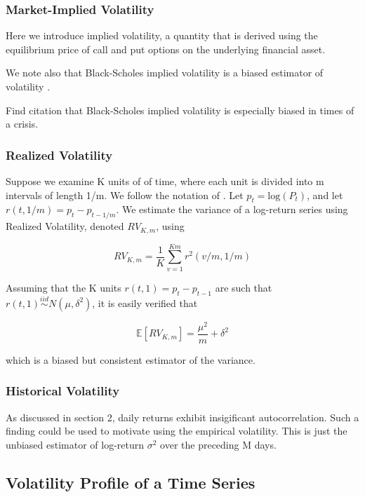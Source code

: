 \documentclass[11pt]{article}
\newcommand{\simiid}{\stackrel{iid}{\sim}} %
\def\E{\mathbb{E}} %
\theoremstyle{definition}
\begin{document}
\subsubsection{Market-Implied Volatility}

Here we introduce implied volatility, a quantity that is derived using the equilibrium price of call and put options on the underlying financial asset.

We note also that Black-Scholes implied volatility is a biased estimator of volatility \citep{christensen1998relation}.

Find citation that Black-Scholes implied volatility is especially biased in times of a crisis.

\subsubsection{Realized Volatility}

Suppose we examine K units of of time, where each unit is divided into m intervals of length 1/m.  We follow the notation of  \citet{andersen2008realized}. Let $p_{t} = \text{log}(P_{t})$, and let $r(t, 1/m) = p_{t} - p_{t-1/m}$.  We estimate the variance of a log-return series using Realized Volatility, denoted $RV_{K,m}$, using

$$RV_{K,m} = \frac{1}{K}\sum^{Km}_{v=1}r^{2}(v/m,1/m)$$

Assuming that the K units $r(t, 1) = p_{t} - p_{t-1}$ are such that $r(t, 1) \simiid N(\mu, \delta^{2})$, it is easily verified that 

$$\E[RV_{K,m}] = \frac{\mu^{2}}{m} + \delta^{2}$$

which is a biased but consistent estimator of the variance.

\subsubsection{Historical Volatility}

As discussed in section 2, daily returns exhibit insigificant autocorrelation.  Such a finding could be used to motivate using the empirical volatility.  This is just the unbiased estimator of log-return $\sigma^{2}$ over the preceding M days.

\subsection{Volatility Profile of a Time Series}
\label{Volatility Profile of a Time Series}
\end{document}
